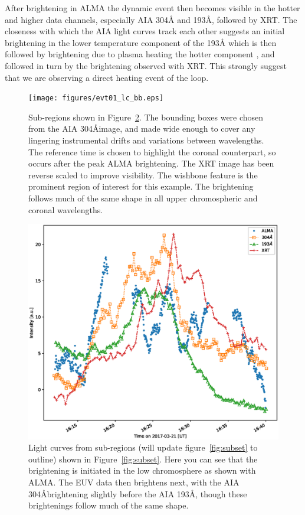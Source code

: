 \documentclass[twocolumn]{aastex62}
\begin{document}
After brightening in ALMA the dynamic event then becomes visible in the hotter and higher data channels, especially AIA 304\AA{} and 193\AA{}, followed by XRT. 
The closeness with which the AIA light curves track each other suggests an initial brightening in the lower temperature component of the 193\AA{} which is then followed by brightening due to plasma heating the hotter component \citep[see details of the two 193\AA{} components shown in Figure~11 of ]{2012Boerner}, and followed in turn by the brightening observed with XRT. 
This strongly suggest that we are observing a direct heating event of the loop. 
\begin{figure}
    \centering
    \texttt{[image: figures/evt01\_lc\_bb.eps]}
    \caption{Sub-regions  shown in Figure~\ref{fig:lightcurves}. The bounding boxes were chosen from the AIA 304\AA image, and made wide enough to cover any lingering instrumental drifts and variations between wavelengths. The reference time is chosen to highlight the coronal counterpart, so occurs after the peak ALMA brightening. The XRT image has been reverse scaled to improve visibility. The wishbone feature is the prominent region of interest for this example. The brightening follows much of the same shape in all upper chromospheric and coronal wavelengths.}
    \label{fig:wishbonezoom}
\end{figure}
\begin{figure}
    \centering
    \includegraphics[width=\linewidth]{figures/evt01_lc_v2.eps}
    \caption{Light curves from sub-regions (will update figure~\ref{fig:subset} to outline) shown in Figure~\ref{fig:subset}. Here you can see that the brightening is initiated in the low chromosphere as shown with ALMA. The EUV data then brightens next, with the AIA 304\AA brightening slightly before the AIA 193\AA, though these brightenings follow much of the same shape.}
    \label{fig:lightcurves}
\end{figure}
\end{document}
